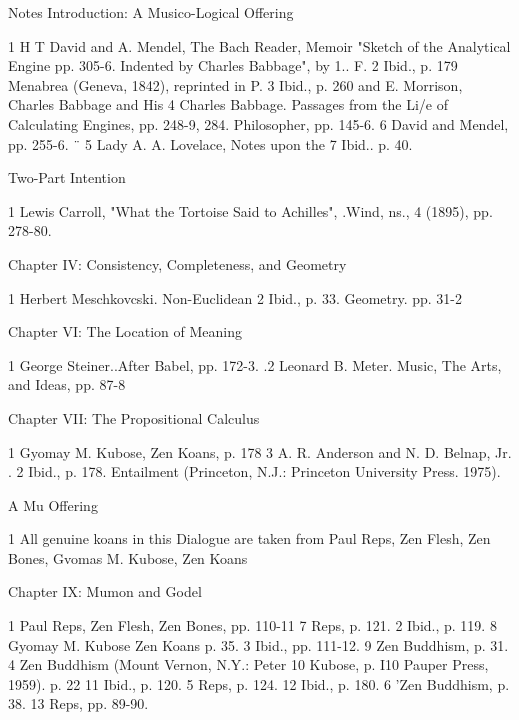 
                                                Notes
                               Introduction: A Musico-Logical Offering

1 H T David and A. Mendel, The Bach Reader,               Memoir "Sketch of the Analytical Engine
pp. 305-6.                                                Indented by Charles Babbage", by 1.. F.
2 Ibid., p. 179                                           Menabrea (Geneva, 1842), reprinted in P.
3 Ibid., p. 260                                           and E. Morrison, Charles Babbage and His
4 Charles Babbage. Passages from the Li/e of              Calculating Engines, pp. 248-9, 284.
Philosopher, pp. 145-6.                                   6 David and Mendel, pp. 255-6. ¨
5 Lady A. A. Lovelace, Notes upon the                     7 Ibid.. p. 40.

                                            Two-Part Intention

1 Lewis Carroll, "What the Tortoise Said to Achilles", .Wind, ns., 4 (1895), pp. 278-80.

                        Chapter IV: Consistency, Completeness, and Geometry

1 Herbert Meschkovcski. Non-Euclidean                     2 Ibid., p. 33.
Geometry. pp. 31-2

                                 Chapter VI: The Location of Meaning

1 George Steiner..After Babel, pp. 172-3.                 .2 Leonard B. Meter. Music, The Arts, and Ideas,
                                                          pp. 87-8

                                Chapter VII: The Propositional Calculus

1 Gyomay M. Kubose, Zen Koans, p. 178                     3 A. R. Anderson and N. D. Belnap, Jr. .
2 Ibid., p. 178.                                          Entailment (Princeton, N.J.: Princeton University
                                                          Press. 1975).

                                              A Mu Offering

1 All genuine koans in this Dialogue are taken from Paul Reps, Zen Flesh, Zen Bones, Gvomas M. Kubose,
Zen Koans

                                    Chapter IX: Mumon and Godel

1 Paul Reps, Zen Flesh, Zen Bones, pp. 110-11             7 Reps, p. 121.
2 Ibid., p. 119.                                          8 Gyomay M. Kubose Zen Koans p. 35.
3 Ibid., pp. 111-12.                                      9 Zen Buddhism, p. 31.
4 Zen Buddhism (Mount Vernon, N.Y.: Peter                 10 Kubose, p. I10
Pauper Press, 1959). p. 22                                11 Ibid., p. 120.
5 Reps, p. 124.                                           12 Ibid., p. 180.
6 'Zen Buddhism, p. 38.                                   13 Reps, pp. 89-90.

